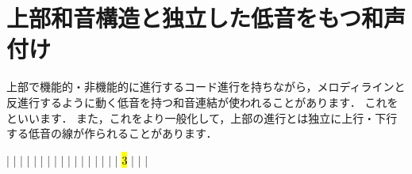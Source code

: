 \documentclass[dvipdfmx,uplatex,b5paper,openany,jbase=12Q,nomag*,textwidth-limit=44%
               ]{gachimuchi}
\begin{document}
\section{上部和音構造と独立した低音をもつ和声付け}
上部で機能的・非機能的に進行するコード進行を持ちながら，メロディラインと
反進行するように動く低音を持つ和音連結が使われることがあります．
これをといいます．
また，これをより一般化して，上部の進行とは独立に上行・下行する低音の線が作られることがあります．

\begin{Music}
  \nobarnumbers%
  \Startpiece%
  \NOtes
  \qp|%
  \en\bar
  \NOtes
  |%
  \en\bar
  \NOtes
  |%
  \en\bar
  \NOTEs
  |%
  \en\bar
  \NOTesp
  |%
  \en\NOtes
  |\Mryaku\sk
  \en\setdoublebar
  \endpiece
  \nobarnumbers%
  \Startpiece
  \NOtes
  \qp|%
  \en\bar
  \NOtes
  |%
  \en\bar
  \NOtes
  |%
  \en\bar\hardspace{\WNwidth}%
  \NOTes
  |%
  \hl{3}%
  \en\bar
  \NOTesp
  |%
  \en\NOtes
  |\Mryaku\sk
  \en\setdoublebar
  \endpiece%
\end{Music}
\end{document}
